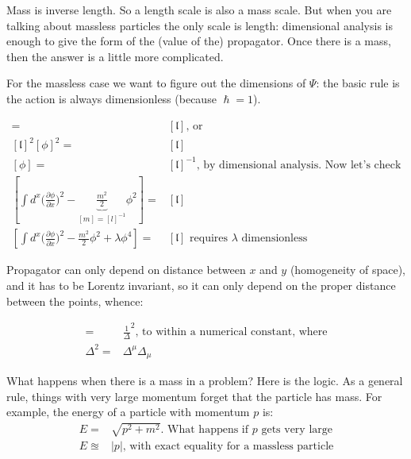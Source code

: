 \documentclass[]{article}
\begin{document}
Mass is inverse length. So a length scale is also a mass scale. But when you are talking about massless particles the only scale is length: dimensional analysis is enough to give the form of the (value of the) propagator. Once there is a mass, then the answer is a little more complicated.

For the massless case we want to figure out the dimensions of $\Psi$: the basic rule is the action is always dimensionless (because $\hslash=1$).



\begin{align*}
	[\int d^x \big(\frac{\partial \phi}{\partial x}\big)^2] =&[\mathfrak{l}] \text{, or}\\
	[\mathfrak{l}]^2[\phi]^2=&[\mathfrak{l}]\\
	[\phi]=&[\mathfrak{l}]^{-1} \text{, by dimensional analysis. Now let's check}\\
	[\int d^x \big(\frac{\partial \phi}{\partial x}\big)^2 - \underbrace{\frac{m^2}{2}}_\text{$[m]=[l]^{-1}$} \phi^2]=&[\mathfrak{l}]\\
	[\int d^x \big(\frac{\partial \phi}{\partial x}\big)^2 - \frac{m^2}{2}\phi^2 + \lambda \phi^4] =&[\mathfrak{l}] \text{ requires $\lambda$ dimensionless}
\end{align*}

Propagator can only depend on distance between $x$ and $y$ (homogeneity of space), and it has to be Lorentz invariant, so it can only depend on the proper distance between the points, whence:

\begin{align*}
	[\braket{0|\Phi(x)\Phi(y)|0}]=&\frac{1}{\Delta}^2 \text{, to within a numerical constant, where}\\
	\Delta^2 =& \Delta^\mu\Delta_\mu
\end{align*}

What happens when there is a mass in a problem? Here is the logic. As a general rule, things with very large momentum forget that the particle has mass. For example, the energy of a particle with momentum $p$ is:
\begin{align*}
	E =& \sqrt{p^2 + m^2} \text{. What happens if $p$ gets very large}\\
	E \approxeq& \lvert p \rvert \text{, with exact equality for a massless particle}
\end{align*} 
\end{document}
